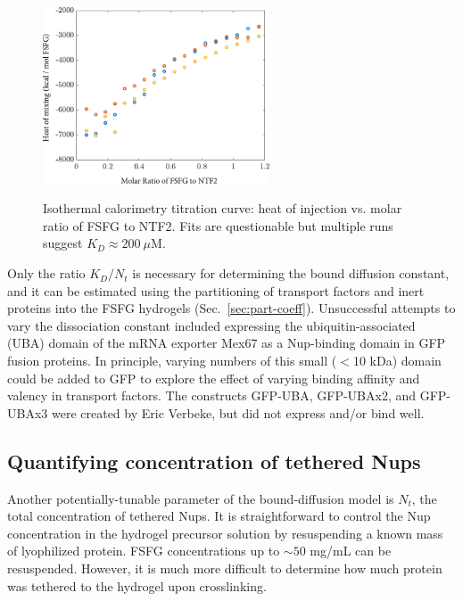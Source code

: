 \begin{figure}
\caption[Isothermal titration calorimetry with NTF2 and FSFG.]{Isothermal calorimetry titration curve: heat of injection vs. molar ratio of FSFG to NTF2. Fits are questionable but multiple runs suggest $K_D \approx 200\ \mu$M.}
\centering
\includegraphics[width=0.6\textwidth]{figs/ch04/ITC_runs}
\label{fig:ITC-runs}
\end{figure} 

Only the ratio $K_D/N_t$ is necessary for determining the bound diffusion constant, and it can be estimated using the partitioning of transport factors and inert proteins into the FSFG hydrogels (Sec.~\ref{sec:part-coeff}).  Unsuccessful attempts to vary the dissociation constant included expressing the ubiquitin-associated (UBA) domain of the mRNA exporter Mex67 as a Nup-binding domain in GFP fusion proteins.  In principle, varying numbers of this small ($<$10 kDa) domain could be added to GFP to explore the effect of varying binding affinity and valency in transport factors.  The constructs GFP-UBA, GFP-UBAx2, and GFP-UBAx3 were created by Eric Verbeke, but did not express and/or bind well.


\subsection{Quantifying concentration of tethered Nups}
\label{sec:Nup-conc}

Another potentially-tunable parameter of the bound-diffusion model is $N_t$, the total concentration of tethered Nups.  It is straightforward to control the Nup concentration in the hydrogel precursor solution by resuspending a known mass of lyophilized protein.  FSFG concentrations up to $\sim 50$ mg/mL can be resuspended.  However, it is much more difficult to determine how much protein was tethered to the hydrogel upon crosslinking. 

